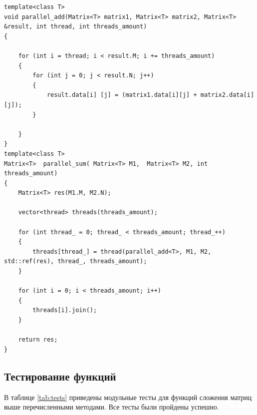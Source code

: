 \begin{lstlisting}[caption=Алгоритм параллельного сложения матриц, label=list:vinograd, language={}]
template<class T>
void parallel_add(Matrix<T> matrix1, Matrix<T> matrix2, Matrix<T> &result, int thread, int threads_amount)
{

	for (int i = thread; i < result.M; i += threads_amount)
	{
		for (int j = 0; j < result.N; j++)
		{
			result.data[i] [j] = (matrix1.data[i][j] + matrix2.data[i][j]);
		}

	}
}
template<class T>
Matrix<T>  parallel_sum( Matrix<T> M1,  Matrix<T> M2, int threads_amount)
{
	Matrix<T> res(M1.M, M2.N);

	vector<thread> threads(threads_amount);

	for (int thread_ = 0; thread_ < threads_amount; thread_++)
	{
		threads[thread_] = thread(parallel_add<T>, M1, M2, std::ref(res), thread_, threads_amount);
	}

	for (int i = 0; i < threads_amount; i++)
	{
		threads[i].join();
	}

	return res;
}

\end{lstlisting}
\subsection{Тестирование функций}

В таблице \ref{tab:tests} приведены модульные тесты для функций сложения матриц выше перечисленными методами. Все тесты были пройдены успешно. \\


